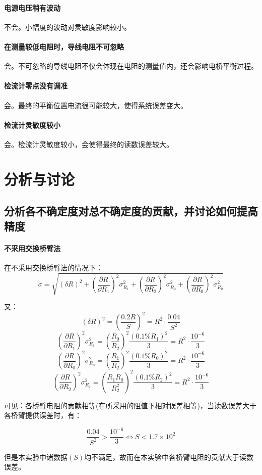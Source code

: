 \documentclass{ctexart}
\begin{document}
\paragraph{电源电压稍有波动}不会。小幅度的波动对灵敏度影响较小。
\paragraph{在测量较低电阻时，导线电阻不可忽略}会。不可忽略的导线电阻不仅会体现在电阻的测量值内，还会影响电桥平衡过程。
\paragraph{检流计零点没有调准}会。最终的平衡位置电流很可能较大，使得系统误差变大。
\paragraph{检流计灵敏度较小}会。检流计灵敏度较小，会使得最终的读数误差较大。
\section{分析与讨论}
\subsection{分析各不确定度对总不确定度的贡献，并讨论如何提高精度}
\paragraph{不采用交换桥臂法}
在不采用交换桥臂法的情况下：
$$\sigma=\sqrt{(\delta R)^2+(\frac{\partial R}{\partial R_{1}})^2\sigma_{R_{1}}^2+(\frac{\partial R}{\partial R_{2}})^2\sigma_{R_{2}}^2+(\frac{\partial R}{\partial R_{0}})^2\sigma_{R_{0}}^2}$$

又：
$$(\delta R)^2=(\frac{0.2R}{S})^2=R^2\cdot \frac{0.04}{S^2}$$
$$(\frac{\partial R}{\partial R_{1}})^2\sigma_{R_{1}}^2=(\frac{R_0}{R_2})^2\frac{(0.1\% R_1)^2}{3}=R^2\cdot \frac{10^{-6}}{3}$$
$$(\frac{\partial R}{\partial R_{0}})^2\sigma_{R_{0}}^2=(\frac{R_1}{R_2})^2\frac{(0.1\% R_0)^2}{3}=R^2\cdot \frac{10^{-6}}{3}$$
$$(\frac{\partial R}{\partial R_{2}})^2\sigma_{R_{2}}^2=(\frac{R_1R_0}{R_2^2})^2\frac{(0.1\% R_2)^2}{3}=R^2\cdot \frac{10^{-6}}{3}$$

可见：各桥臂电阻的贡献相等(在所采用的阻值下相对误差相等)，当读数误差大于各桥臂提供误差时，有：

$$\frac{0.04}{S^2}>\frac{10^{-6}}{3}\Leftrightarrow S<1.7\times 10^2 $$

但是本实验中诸数据$(S)$均不满足，故而在本实验中各桥臂电阻的贡献大于读数误差。
\end{document}
